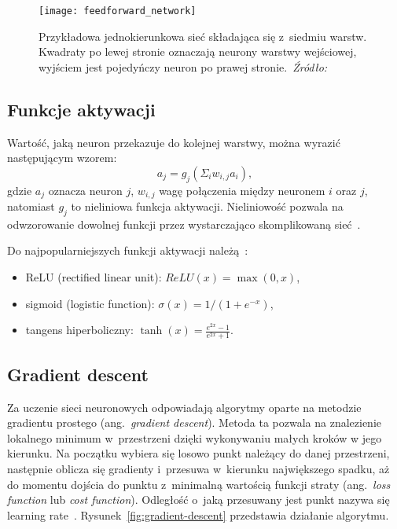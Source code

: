 \begin{figure}[h]
    \centering
    \texttt{[image: feedforward\_network]}
    \caption{Przykładowa jednokierunkowa sieć składająca się z~siedmiu warstw. Kwadraty po lewej stronie oznaczają neurony warstwy wejściowej, wyjściem jest pojedyńczy neuron po prawej stronie.~\textit{Źródło:~\cite{Russell2020}}}
    \label{fig:feedforward-network}
\end{figure}

\subsection{Funkcje aktywacji}\label{subsec:funkcje-aktywacji}

Wartość, jaką neuron przekazuje do kolejnej warstwy, można wyrazić następującym wzorem:
\[a_{j} = g_{j}(\Sigma_{i}w_{i,j}a_{i}),\]
gdzie \(a_{j}\) oznacza neuron \(j\), \(w_{i,j}\) wagę połączenia między neuronem \(i\) oraz \(j\), natomiast \(g_{j}\) to nieliniowa funkcja aktywacji.
Nieliniowość pozwala na odwzorowanie dowolnej funkcji przez wystarczająco skomplikowaną sieć~\cite{Russell2020}.

Do najpopularniejszych funkcji aktywacji należą~\cite{Russell2020}:

\begin{itemize}
    \item ReLU (rectified linear unit): \(ReLU(x) = \max(0, x)\),
    \item sigmoid (logistic function): \(\sigma(x) = 1 / (1 + e^{-x})\),
    \item tangens hiperboliczny: \(\tanh(x) = \frac{e^{2x} - 1} {e^{2x} + 1}\).
\end{itemize}

\subsection{Gradient descent}\label{subsec:gradient-descent}

Za uczenie sieci neuronowych odpowiadają algorytmy oparte na metodzie gradientu prostego (ang.~\textit{gradient descent}).
Metoda ta pozwala na znalezienie lokalnego minimum w~przestrzeni dzięki wykonywaniu małych kroków w jego kierunku.
Na początku wybiera się losowo punkt należący do danej przestrzeni, następnie oblicza się gradienty i~przesuwa w~kierunku największego spadku, aż do momentu dojścia do punktu z~minimalną wartością funkcji straty (ang.~\textit{loss function} lub \textit{cost function}). Odległość o~jaką przesuwany jest punkt nazywa się learning rate~\cite{Russell2020}.
Rysunek~\ref{fig:gradient-descent} przedstawia działanie algorytmu.

